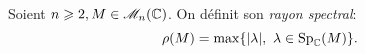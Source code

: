 \begin{tcolorbox}
    Soient $n \geqslant 2, M \in \mathscr{M}_n(\mathbb{C})$. On définit son \emph{rayon spectral}:
    $$\rho(M) = \max \{ |\lambda |,\ \lambda \in \mathrm{Sp}_{\mathbb{C}}(M) \}.$$
\end{tcolorbox}